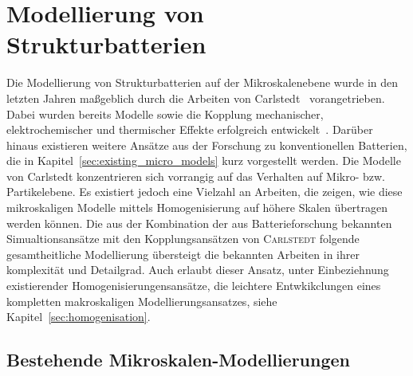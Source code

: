 \chapter{\label{sec:modelling_SB}Modellierung von Strukturbatterien}
Die Modellierung von Strukturbatterien auf der Mikroskalenebene wurde in den letzten Jahren maßgeblich durch die Arbeiten von Carlstedt~\cite{Carlstedt2018,Carlstedt2019,Carlstedt2022a,Carlstedt2023} vorangetrieben. Dabei wurden bereits Modelle sowie die Kopplung mechanischer, elektrochemischer und thermischer Effekte erfolgreich entwickelt~\cite{Carlstedt2022,Carlstedt2022b}. Darüber hinaus existieren weitere Ansätze aus der Forschung zu konventionellen Batterien, die in Kapitel~\ref{sec:existing_micro_models} kurz vorgestellt werden. Die Modelle von Carlstedt konzentrieren sich vorrangig auf das Verhalten auf Mikro- bzw. Partikelebene. Es existiert jedoch eine Vielzahl an Arbeiten, die zeigen, wie diese mikroskaligen Modelle mittels Homogenisierung auf höhere Skalen übertragen werden können. Die aus der Kombination der aus Batterieforschung bekannten Simualtionsansätze mit den Kopplungsansätzen von \textsc{Carlstedt} folgende gesamtheitliche Modellierung übersteigt die bekannten Arbeiten in ihrer komplexität und Detailgrad. Auch erlaubt dieser Ansatz, unter Einbeziehnung existierender Homogenisierungensansätze, die leichtere Entwkikclungen eines kompletten makroskaligen Modellierungsansatzes, siehe Kapitel~\ref{sec:homogenisation}.

\section{\label{sec:existing_micro_models}Bestehende Mikroskalen-Modellierungen}

